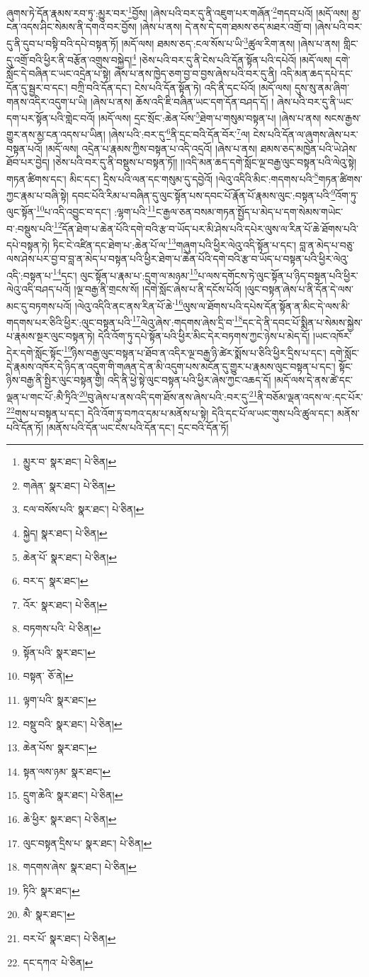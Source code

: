 ཞུགས་ཏེ་དོན་རྣམས་རབ་ཏུ་:མྱུར་བར་\footnote{མྱུར་བ་  སྣར་ཐང་།  པེ་ཅིན། }བྱོས། །ཞེས་པའི་བར་དུ་ནི་འཇུག་པར་གཞོན་\footnote{གཞེན་  སྣར་ཐང་།  པེ་ཅིན། }གདབ་པའོ། །མདོ་ལས། མྱ་ངན་འདས་ཤིང་སེམས་ནི་དགའ་བར་བྱོས། །ཞེས་པ་ནས། དེ་ནས་དེ་དག་ཐམས་ཅད་མཐར་འགྲོ་བ། །ཞེས་པའི་བར་དུ་ནི་དུབ་པ་བསྟི་བའི་དཔེ་བསྟན་ཏོ། །མདོ་ལས། ཐམས་ཅད་:ངལ་སོས་པ་ཡི་\footnote{ངལ་བསོས་པའི་  སྣར་ཐང་།  པེ་ཅིན། }ཚུལ་རིག་ནས། །ཞེས་པ་ནས། གླིང་དུ་འགྲོ་བའི་ཕྱིར་ནི་བརྩོན་འགྲུས་བསྐྱེད།\footnote{སྐྱེད།  སྣར་ཐང་།  པེ་ཅིན། } །ཅེས་པའི་བར་དུ་ནི་ངེས་པའི་དོན་སྟོན་པའི་དཔེའོ། །མདོ་ལས། དགེ་སློང་དེ་བཞིན་ང་ཡང་འདྲེན་པ་སྟེ། ཞེས་པ་ནས་ཁྱེད་ཅག་བྱ་བ་བྱས་ཞེས་པའི་བར་དུ་ནི། འདི་མན་ཆད་དཔེ་དང་དོན་དུ་སྦྱར་བ་དང་། བཀྲི་བའི་དོན་དང་། ངེས་པའི་དོན་སྟོན་ཏེ། འདི་ནི་དང་པོའོ། །མདོ་ལས། དུས་སུ་ནམ་ཞིག་གནས་འདིར་འདུག་པ་ཡི། །ཞེས་པ་ནས། ཆོས་འདི་ཇི་བཞིན་ཡང་དག་དོན་བཤད་དོ། །
ཞེས་པའི་བར་དུ་ནི་ཡང་དག་པར་སྟོན་པའི་གླེང་བའོ། །མདོ་ལས། དྲང་སྲོང་:ཆེན་པོས་\footnote{ཆེན་པོ་  སྣར་ཐང་།  པེ་ཅིན། }ཐེག་པ་གསུམ་བསྟན་པ། །ཞེས་པ་ནས། སངས་རྒྱས་གྱུར་ནས་མྱ་ངན་འདས་པ་ཡིན། །ཞེས་པའི་:བར་དུ་\footnote{བར་ད་  སྣར་ཐང་། }ནི་དྲང་བའི་དོན་བོར་\footnote{འོར་  སྣར་ཐང་།  པེ་ཅིན། }ལ། ངེས་པའི་དོན་ལ་ཞུགས་ཞེས་པར་བསྟན་པའོ། །མདོ་ལས། འདྲེན་པ་རྣམས་ཀྱིས་བསྟན་པ་འདི་འདྲའོ། །ཞེས་པ་ནས། ཐམས་ཅད་མཁྱེན་པའི་ཡེ་ཤེས་ཐོབ་པར་བྱེད། །ཅེས་པའི་བར་དུ་ནི་བསྡུས་པ་བསྟན་ཏོ།། །།འདི་མན་ཆད་དགེ་སློང་ལྔ་བརྒྱ་ལུང་བསྟན་པའི་ལེའུ་སྟེ། གཏན་ཚིགས་དང་། མིང་དང་། དྲིས་པའི་ལན་དང་གསུམ་དུ་དབྱེའོ། །ལེའུ་འདིའི་མིང་:གདགས་པའི་\footnote{བཏགས་པའི་  པེ་ཅིན། }གཏན་ཚིགས་ཀྱང་རྣམ་པ་བཞི་སྟེ། དབང་པོའི་རིམ་པ་བཞིན་དུ་ལུང་སྟོན་པས་དབང་པོ་རྣོན་པོ་རྣམས་ལུང་:བསྟན་པའི་\footnote{སྟོན་པའི་  སྣར་ཐང་། }འོག་ཏུ་ལུང་སྟོན་\footnote{བསྟན་  ཅོ་ནེ། }པ་འདི་འབྱུང་བ་དང་། :ལྷག་པའི་\footnote{ལྟག་པའི་  སྣར་ཐང་། }ང་རྒྱལ་ཅན་བསམ་གཏན་སྤྱོད་པ་མེད་པ་དག་སེམས་གཡེང་བ་:བསྡུས་པའི་\footnote{བསྡུ་བའི་  སྣར་ཐང་།  པེ་ཅིན། }དོན་ཐེག་པ་ཆེན་པོའི་དགེ་བའི་རྩ་བ་ཡོད་པར་མི་ཤེས་པའི་དཔེར་ལུས་ལ་རིན་པོ་ཆེ་ཐོགས་པའི་དཔེ་བསྟན་ཏེ། ཏིང་ངེ་འཛིན་དང་ཐེག་པ་:ཆེན་པོ་ལ་\footnote{ཆེན་པོས་  སྣར་ཐང་། }གཞུག་པའི་ཕྱིར་ལེའུ་འདི་སྟོན་པ་དང་། བླ་ན་མེད་པ་བཅུ་ལས་ཤེས་པར་བྱ་བ་བླ་ན་མེད་པ་བསྟན་པའི་ཕྱིར་ཐེག་པ་ཆེན་པོའི་དགེ་བའི་རྩ་བ་ཡོད་པ་བསྟན་པའི་ཕྱིར་ལེའུ་འདི་:བསྟན་པ་\footnote{སྟན་ལས་ཉམ་  སྣར་ཐང་། }དང་། ལུང་སྟོན་པ་རྣམ་པ་:དྲུག་ལ་མཉམ་\footnote{དྲུག་ཆེའི་  སྣར་ཐང་།  པེ་ཅིན། }པ་ལས་དགོངས་ཏེ་ལུང་སྟོན་པ་ཉིད་བསྟན་པའི་ཕྱིར་ལེའུ་འདི་བཤད་པའོ། །ལྔ་བརྒྱ་ནི་གྲངས་སོ། །དགེ་སློང་ཞེས་པ་ནི་དངོས་པོའོ། །ལུང་བསྟན་ཞེས་པ་ནི་དོན་དེ་ལས་མང་དུ་བཏགས་པའོ། །ལེའུ་འདིའི་ནང་ནས་རིན་པོ་ཆེ་\footnote{ཆེ་ཕྱིར་  སྣར་ཐང་།  པེ་ཅིན། }ལུས་ལ་ཐོགས་པའི་དཔེས་དོན་སྟོན་ན་མིང་དེ་ལས་མི་གདགས་པར་ཅིའི་ཕྱིར་:ལུང་བསྟན་པའི་\footnote{ལུང་བསྟན་དྲིས་པ་  སྣར་ཐང་།  པེ་ཅིན། }ལེའུ་ཞེས་:གདགས་ཞེས་དྲི་བ་\footnote{གདགས་ཞེས་  སྣར་ཐང་།  པེ་ཅིན། }དང་དེ་ནི་དབང་པོ་སྨིན་པ་སེམས་སྐྱེས་པ་རྣམས་སྔར་ལུང་བསྟན་ཏེ། དེའི་འོག་ཏུ་དཔེ་སྟོན་པའི་ཕྱིར་མིང་དེར་བཏགས་ཀྱང་ཉེས་པ་མེད་དོ། །ཡང་འཁོར་དེར་དགེ་སློང་སྟོང་\footnote{ཏིའི་  སྣར་ཐང་། }ཉིས་བརྒྱ་ལུང་བསྟན་པ་ཐོབ་ན་འདིར་ལྔ་བརྒྱ་ཉི་ཚེར་སྨོས་པ་ཅིའི་ཕྱིར་དྲིས་པ་དང་། དགེ་སློང་དེ་རྣམས་འཁོར་དེ་ཉིད་ན་འདུག་གི་གཞན་དེ་ན་མི་འདུག་པས་མངོན་དུ་གྱུར་པ་རྣམས་ལུང་བསྟན་པ་དང་། སྟོང་ཉིས་བརྒྱ་ནི་སྤྱིར་ལུང་བསྟན་གྱི། འདི་ནི་ཕྱེ་སྟེ་ལུང་བསྟན་པའི་ཕྱིར་ཞེས་ཀྱང་འཆད་དོ། །མདོ་ལས་དེ་ནས་ཚེ་དང་ལྡན་པ་གང་པོ་:མཻ་ཏྲིའི་\footnote{མཻ་  སྣར་ཐང་། }བུ་ཞེས་པ་ནས་འདི་དག་ཐོས་ནས་ཞེས་པའི་:བར་དུ་\footnote{བར་པོ་  སྣར་ཐང་།  པེ་ཅིན། }ནི་བཅོམ་ལྡན་འདས་ལ་:དང་པོར་\footnote{དང་དཀའ་  པེ་ཅིན། }གུས་པ་བསྟན་པ་དང་། དེའི་འོག་ཏུ་བཀའ་དམ་པ་མནོས་པ་སྟེ། དེའི་དང་པོ་ལ་ཡང་གུས་པའི་ཚུལ་དང་། མནོས་པའི་དོན་ཏོ། །མནོས་པའི་དོན་ཡང་ངེས་པའི་དོན་དང་། དྲང་བའི་དོན་ཏོ། 
